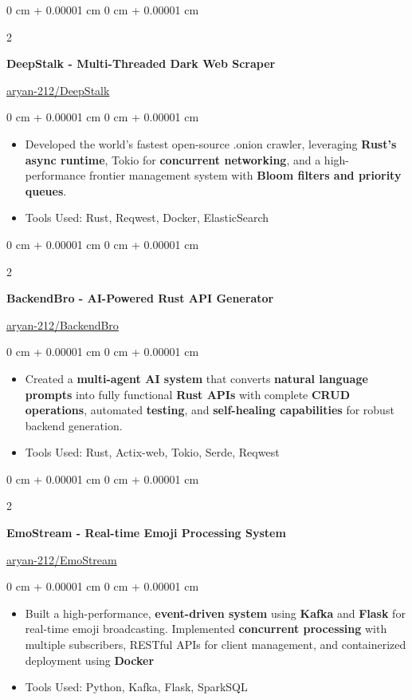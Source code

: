 \documentclass[10pt, letterpaper]{article}
\newenvironment{highlights}{
    \begin{itemize}[
        topsep=0.10 cm,
        parsep=0.10 cm,
        partopsep=0pt,
        itemsep=0pt,
        leftmargin=0 cm + 10pt
    ]
}{
    \end{itemize}
} %
\newenvironment{onecolentry}{
    \begin{adjustwidth}{
        0 cm + 0.00001 cm
    }{
        0 cm + 0.00001 cm
    }
}{
    \end{adjustwidth}
} %
\newenvironment{twocolentry}[2][]{
    \onecolentry
    \def\secondColumn{#2}
    \setcolumnwidth{\fill, 4.5 cm}
    \begin{paracol}{2}
}{
    \switchcolumn \raggedleft \secondColumn
    \end{paracol}
    \endonecolentry
} %
\begin{document}
\vspace{0.2 cm}
\begin{twocolentry}{
    \href{https://github.com/aryan-212/DeepStalk.git}{aryan-212/DeepStalk}
}
    \textbf{DeepStalk - Multi-Threaded Dark Web Scraper}
\end{twocolentry}

\begin{onecolentry}
    \begin{highlights}
            \item Developed the world’s fastest open-source .onion crawler, leveraging \textbf{Rust’s async runtime}, Tokio for \textbf{concurrent networking}, and a high-performance frontier management system with \textbf{Bloom filters and priority queues}.
        \item Tools Used: Rust, Reqwest, Docker, ElasticSearch
    \end{highlights}
\end{onecolentry}

\vspace{0.2 cm}
\begin{twocolentry}{
    \href{https://github.com/aryan-212/BackendBro.git}{aryan-212/BackendBro}
}
    \textbf{BackendBro - AI-Powered Rust API Generator}
\end{twocolentry}

\begin{onecolentry}
    \begin{highlights}
        \item Created a \textbf{multi-agent AI system} that converts \textbf{natural language prompts} into fully functional \textbf{Rust APIs} with complete \textbf{CRUD operations}, automated \textbf{testing}, and \textbf{self-healing capabilities} for robust backend generation.

        \item Tools Used: Rust, Actix-web, Tokio, Serde, Reqwest
    \end{highlights}
\end{onecolentry}

\vspace{0.2 cm}
\begin{twocolentry}{
    \href{https://github.com/aryan-212/EmoStream}{aryan-212/EmoStream}
}
    \textbf{EmoStream - Real-time Emoji Processing System}
\end{twocolentry}

\begin{onecolentry}
    \begin{highlights}
        \item Built a high-performance, \textbf{event-driven system} using \textbf{Kafka} and \textbf{Flask} for real-time emoji broadcasting. Implemented \textbf{concurrent processing} with multiple subscribers, RESTful APIs for client management, and containerized deployment using \textbf{Docker}
        \item Tools Used: Python, Kafka, Flask, SparkSQL
    \end{highlights}
\end{onecolentry}
\end{document}
